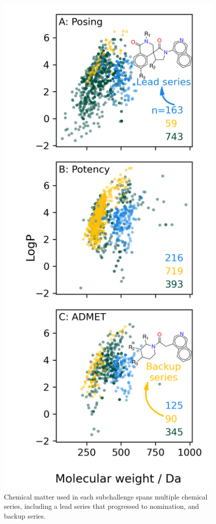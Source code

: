 \documentclass[journal=jcim,manuscript=article]{achemso}
\begin{document}
\begin{figure}
    \includegraphics[scale=0.9]{03_figs_data_preparation/subchallenge_physprops_with_scaffolds.png}
  \caption{Chemical matter used in each subchallenge  spans multiple chemical series, including a lead series that progressed to nomination, and backup series. }
  \label{fgr:physprops_scaffolds}
\end{figure}
\end{document}
